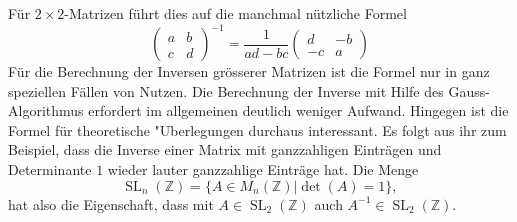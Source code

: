 Für $2\times2$-Matrizen führt dies auf die manchmal nützliche
Formel
\[
\begin{pmatrix}
a&b\\c&d
\end{pmatrix}^{-1}
=
\frac1{ad-bc}\begin{pmatrix}
d&-b\\-c&a
\end{pmatrix}
\]
Für die Berechnung der Inversen grösserer Matrizen ist die Formel
nur in ganz speziellen Fällen von Nutzen.
Die Berechnung der Inverse
mit Hilfe des Gauss-Algorithmus erfordert im allgemeinen deutlich weniger
Aufwand.
Hingegen ist die Formel für theoretische "Uberlegungen durchaus
interessant.
Es folgt aus ihr zum Beispiel, dass die Inverse einer
Matrix mit ganzzahligen Einträgen und Determinante $1$ wieder
lauter ganzzahlige Einträge hat.
Die Menge
\[
\operatorname{SL}_n(\mathbb Z)=\{A\in M_{n}(\mathbb Z)|\det(A)=1\},
\]
hat also die Eigenschaft, dass mit $A\in\operatorname{SL}_2(\mathbb Z)$ 
auch $A^{-1}\in\operatorname{SL}_2(\mathbb Z)$.

